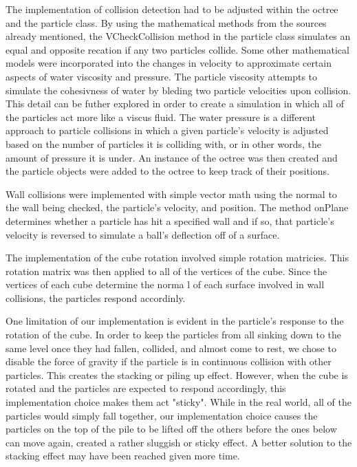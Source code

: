 The implementation of collision detection had to be adjusted within the octree and the particle
class.  By using the mathematical methods from the sources already mentioned, the VCheckCollision
method in the particle class simulates an equal and opposite recation if any two particles 
collide. Some other mathematical models were incorporated into the changes in velocity to 
approximate certain aspects of water viscosity and pressure.  The particle viscosity 
attempts to simulate the cohesivness of water by bleding two particle velocities upon collision.
This detail can be futher explored in order to create a simulation in which all of the 
particles act more like a viscus fluid.  The water pressure is a different approach to
particle collisions in which a given particle's velocity is adjusted based on the number
of particles it is colliding with, or in other words, the amount of pressure it is under.
An instance of the  octree was then created and the particle objects were added to the octree 
to keep track of their positions.

Wall collisions were implemented with simple vector math using the normal to the wall being 
checked, the particle's velocity, and position.  The method onPlane determines whether a particle
has hit a specified wall and if so, that particle's velocity is reversed to simulate a ball's
deflection off of a surface.

The implementation of the cube rotation involved simple rotation matricies.  This rotation matrix was
then applied to all of the vertices of the cube.  Since the vertices of each cube determine the norma
l of each surface involved in wall collisions, the particles respond accordinly.

One limitation of our implementation is evident in the particle's response to the rotation of the cube.
In order to keep the particles from all sinking down to the same level once they had fallen, collided,
and almost come to rest, we chose to disable the force of gravity if the particle is in continuous
collision with other particles.  This creates the stacking or piling up effect. However, when the
cube is rotated and the particles are expected to respond accordingly, this implementation choice 
makes them act "sticky". While in the real world, all of the particles would simply fall together,
our implementation choice causes the particles on the top of the pile to be lifted off the others 
before the ones below can move again, created a rather sluggish or sticky effect.   A better solution
to the stacking effect may have been reached given more time.

